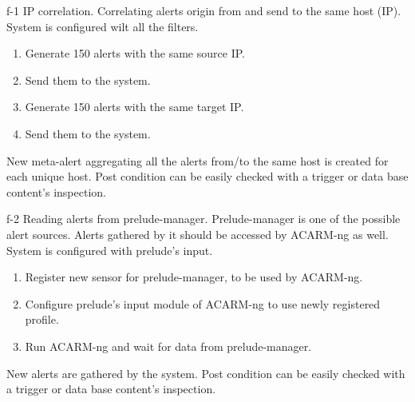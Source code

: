 \testCase
{f-1}
{IP correlation.}
{Correlating alerts origin from and send to the same host (IP).}
{System is configured wilt all the filters.}
{
\begin{enumerate}
\item Generate 150 alerts with the same source IP.
\item Send them to the system.
\item Generate 150 alerts with the same target IP.
\item Send them to the system.
\end{enumerate}
}
{New meta-alert aggregating all the alerts from/to the same host is created for each unique host.}
{Post condition can be easily checked with a trigger or data base content's inspection.}


\testCase
{f-2}
{Reading alerts from prelude-manager.}
{Prelude-manager is one of the possible alert sources. Alerts gathered by it should be accessed by ACARM-ng as well.}
{System is configured with prelude's input.}
{
\begin{enumerate}
\item Register new sensor for prelude-manager, to be used by ACARM-ng.
\item Configure prelude's input module of ACARM-ng to use newly registered profile.
\item Run ACARM-ng and wait for data from prelude-manager.
\end{enumerate}
}
{New alerts are gathered by the system.}
{Post condition can be easily checked with a trigger or data base content's inspection.}
